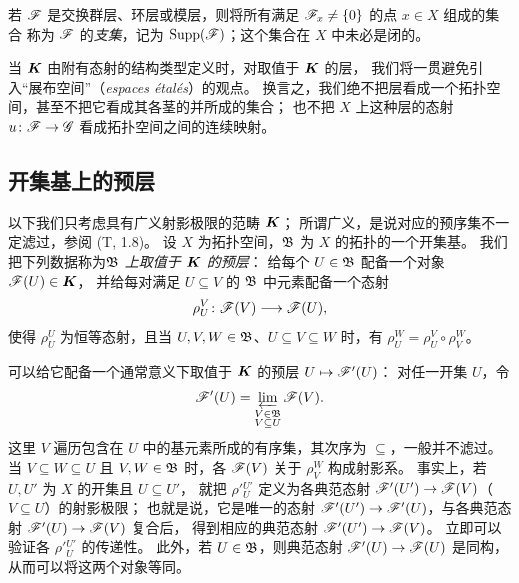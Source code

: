 若 $\mathscr F$ 是交换群层、环层或模层，则将所有满足 $\mathscr F_x\ne\{0\}$ 的点 $x\in X$ 组成的集合
称为 $\mathscr F$ 的\emph{支集}，记为 $\operatorname{Supp}(\mathscr F)$；这个集合在 $X$ 中未必是闭的。

当 $\boldsymbol K$ 由附有态射的结构类型定义时，对取值于 $\boldsymbol K$ 的层，
我们将一贯避免引入“展布空间”（\textit{espaces étalés}）的观点。
换言之，我们绝不把层看成一个拓扑空间，甚至不把它看成其各茎的并所成的集合；
也不把 $X$ 上这种层的态射 $u\colon\mathscr F\to\mathscr G$ 看成拓扑空间之间的连续映射。

\subsection{开集基上的预层}\hypertarget{heading:0:3.2}{}

以下我们只考虑具有广义射影极限的范畴 $\boldsymbol K$；
所谓广义，是说对应的预序集不一定滤过，参阅 (T, 1.8)。
设 $X$ 为拓扑空间，$\mathfrak B$ 为 $X$ 的拓扑的一个开集基。
我们把下列数据称为\emph{$\mathfrak B$ 上取值于 $\boldsymbol K$ 的预层}：
给每个 $U\in\mathfrak B$ 配备一个对象 $\mathscr F(U)\in\boldsymbol K$，
并给每对满足 $U\subseteq V$ 的 $\mathfrak B$ 中元素配备一个态射
\[
 \rho_U^V\colon\mathscr F(V)\longrightarrow\mathscr F(U),
\]
使得 $\rho_U^U$ 为恒等态射，且当 $U,V,W\in\mathfrak B$、$U\subseteq V\subseteq W$ 时，有
$\rho_U^W=\rho_U^V\circ\rho_V^W$。

可以给它配备一个通常意义下取值于 $\boldsymbol K$ 的预层 $U\mapsto\mathscr F'(U)$：
对任一开集 $U$，令
\[
 \mathscr F'(U)=\varprojlim_{\substack{V\in\mathfrak B\\V\subseteq U}}\mathscr F(V).
\]
这里 $V$ 遍历包含在 $U$ 中的基元素所成的有序集，其次序为 $\subseteq$，一般并不滤过。
当 $V\subseteq W\subseteq U$ 且 $V,W\in\mathfrak B$ 时，各 $\mathscr F(V)$ 关于 $\rho_V^W$ 构成射影系。
事实上，若 $U,U'$ 为 $X$ 的开集且 $U\subseteq U'$，
就把 $\rho'{}^{U'}_U$ 定义为各典范态射 $\mathscr F'(U')\to\mathscr F(V)$（$V\subseteq U$）的射影极限；
也就是说，它是唯一的态射 $\mathscr F'(U')\to\mathscr F'(U)$，与各典范态射 $\mathscr F'(U)\to\mathscr F(V)$ 复合后，
得到相应的典范态射 $\mathscr F'(U')\to\mathscr F(V)$。
立即可以验证各 $\rho'{}^{U'}_U$ 的传递性。
此外，若 $U\in\mathfrak B$，则典范态射 $\mathscr F'(U)\to\mathscr F(U)$ 是同构，从而可以将这两个对象等同。

